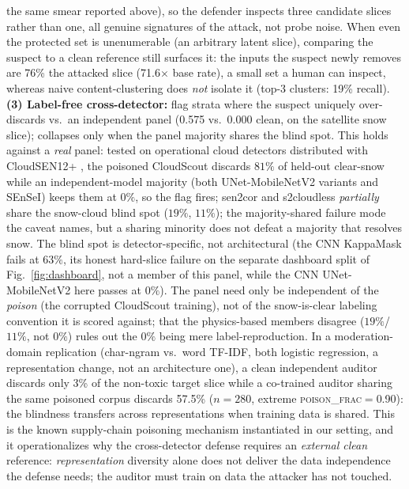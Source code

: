 \documentclass[conference]{IEEEtran}
\begin{document}
the same smear reported above), so the defender inspects three candidate slices rather than one, all genuine
signatures of the attack, not probe noise. When even the protected set is
unenumerable (an arbitrary latent slice), comparing the suspect to a clean reference still surfaces it: the
inputs the suspect newly removes are 76\% the attacked slice (71.6$\times$ base rate), a small set a human
can inspect, whereas naive content-clustering does \emph{not} isolate it (top-3 clusters: 19\% recall). \textbf{(3) Label-free
cross-detector:} flag strata where the suspect uniquely over-discards vs.\ an independent panel (0.575 vs.\
0.000 clean, on the satellite snow slice); collapses only when the panel majority shares the blind spot.
This holds against a \emph{real} panel: tested on operational cloud detectors distributed with
CloudSEN12+ \cite{aybar2024}, the poisoned CloudScout discards $81\%$ of held-out clear-snow while an
independent-model majority (both UNet-MobileNetV2 variants and SEnSeI) keeps them at $0\%$, so the flag fires;
sen2cor and s2cloudless \emph{partially} share the snow-cloud blind spot ($19\%$, $11\%$); the
majority-shared failure mode the caveat names, but a sharing minority does not defeat a majority that resolves
snow. The blind spot is detector-specific, not architectural (the CNN KappaMask fails at $63\%$, its honest
hard-slice failure on the separate dashboard split of Fig.~\ref{fig:dashboard}, not a member of this
panel, while the CNN UNet-MobileNetV2 here passes at $0\%$). The panel need only be independent of the \emph{poison} (the corrupted
CloudScout training), not of the snow-is-clear labeling convention it is scored against; that the
physics-based members disagree ($19\%$/$11\%$, not $0\%$) rules out the $0\%$ being mere label-reproduction.
In a moderation-domain replication (char-ngram vs.\ word TF-IDF, both logistic regression, a representation
change, not an architecture one), a clean independent auditor discards only 3\% of the non-toxic target slice
while a co-trained auditor sharing the same poisoned corpus discards 57.5\% ($n{=}280$, extreme
\textsc{poison\_frac}$=$0.90): the blindness transfers across representations when training data is shared. This
is the known supply-chain poisoning mechanism \cite{biggio2012,steinhardt2017} instantiated in our
setting, and it operationalizes why the cross-detector defense requires an \emph{external clean} reference:
\emph{representation} diversity alone does not deliver the data independence the defense needs; the auditor must
train on data the attacker has not touched.
\end{document}
